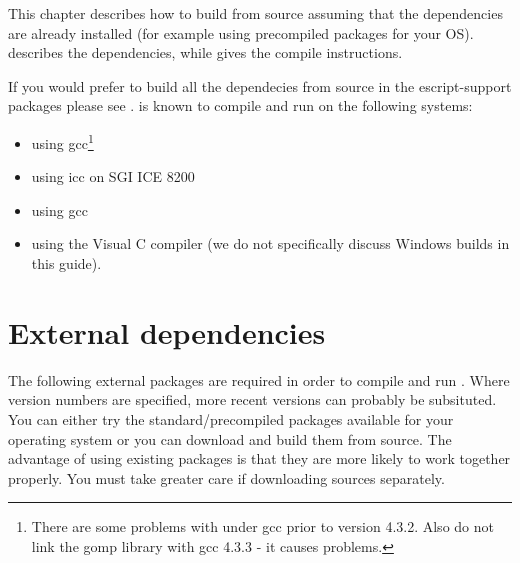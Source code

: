 %
%
%



This chapter describes how to build \esfinley from source assuming that the dependencies are already installed (for example using precompiled packages for your OS).
 describes the dependencies, while  gives the compile instructions.

If you would prefer to build all the dependecies from source in the escript-support packages please see .
\esfinley is known to compile and run on the following systems:
\begin{itemize}
 \item \linux using gcc\footnote{There are some problems with \openmp under gcc prior to version 4.3.2. Also do not link the gomp library with gcc 4.3.3 - it causes problems.}
\item \linux using icc on SGI ICE 8200
\item \macosx using gcc
\item \winxp using the Visual C compiler (we do not specifically discuss Windows builds in this guide).
\end{itemize}

\section{External dependencies}
\label{sec:deps}
The following external packages are required in order to compile and run \esfinley.
Where version numbers are specified, more recent versions can probably be subsituted.
You can either try the standard/precompiled packages available for your operating system or you can download and build them from source.
The advantage of using existing packages is that they are more likely to work together properly.
You must take greater care if downloading sources separately.

